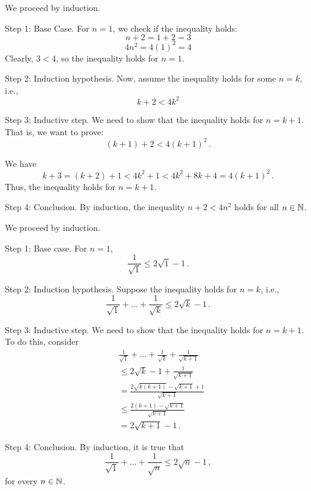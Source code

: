 \documentclass[12pt]{amsart}
\begin{document}
\begin{problem}[4.5.a]
We proceed by induction.

Step 1: Base Case.
For $n = 1$, we check if the inequality holds:
\[
	n + 2 = 1 + 2 = 3
\]
\[
	4n^2 = 4(1)^2 = 4
\]
Clearly, $3 < 4$, so the inequality holds for $n = 1$.

Step 2: Induction hypothesis.
Now, assume the inequality holds for some $n = k$, i.e.,
\[
	k + 2 < 4k^2
\]


Step 3: Inductive step.
We need to show that the inequality holds for $n = k + 1$. That is, we want to prove:
\[
	(k + 1) + 2 < 4(k + 1)^2 \,.
\]

We have
\begin{equation*}
	k + 3  = (k+2) +1 < 4k^2 + 1 < 4k^2 + 8k + 4 = 4(k+1)^2 \,.
\end{equation*}
Thus, the inequality holds for $n=k+1$.

Step 4: Conclusion.
By induction, the inequality $n + 2 < 4n^2$ holds for all $n \in \mathbb{N}$.

\end{problem}

\begin{problem}[4.5.b]
We proceed by induction.

Step 1: Base case.
For $n = 1$,
$$ \frac{1}{\sqrt 1} \leq 2 \sqrt 1 - 1 \,.$$

Step 2: Induction hypothesis.
Suppose the inequality holds for $n = k$, i.e.,
$$ \frac{1}{\sqrt{1}} + \dots + \frac{1}{\sqrt k} \leq 2 \sqrt k - 1 \,. $$


Step 3: Inductive step.
We need to show that the inequality holds for $n = k+1$.
To do this, consider
\begin{align*}
	 & \frac{1}{\sqrt{1}} + \dots + \frac{1}{\sqrt k} + \frac{1}{\sqrt{k+1}} \\
	 & \leq 2 \sqrt{k} - 1 + \frac{1}{\sqrt{k+1}}                            \\
	 & = \frac{ 2 \sqrt{k(k+1)} - \sqrt{k+1} +1}{\sqrt{k+1}}                 \\
	 & \leq \frac{ 2 (k+1) - \sqrt{k+1}}{\sqrt{k+1}}                         \\
	 & = 2 \sqrt{k+1} -1 \,.
\end{align*}

Step 4: Conclusion.
By induction,
it is true that
$$ \frac{1}{\sqrt{1}} + \dots + \frac{1}{\sqrt n} \leq 2 \sqrt n - 1 \,,$$
for every $n\in \mathbb{N}$.

\end{problem}
\end{document}
